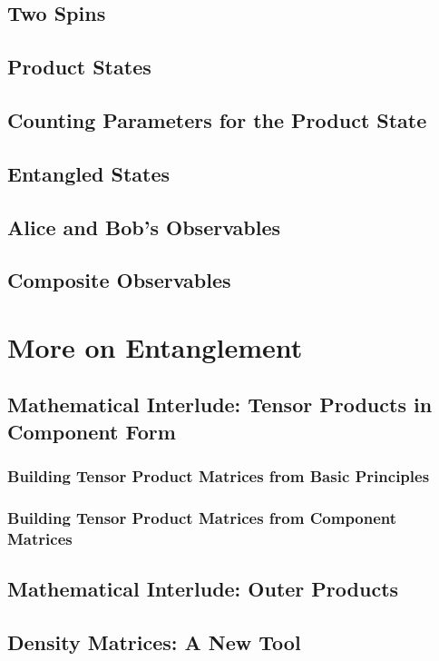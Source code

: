 \documentclass[a4paper]{article}
\begin{document}
\subsection{Two Spins}
\subsection{Product States}

\subsection{Counting Parameters for the Product State}
\subsection{Entangled States}

\subsection{Alice and Bob's Observables}


\subsection{Composite Observables}





\section{More on Entanglement}
\subsection{Mathematical Interlude: Tensor Products in Component Form}
\subsubsection{Building Tensor Product Matrices from Basic Principles}
\subsubsection{Building Tensor Product Matrices from Component Matrices}



\subsection{Mathematical Interlude: Outer Products}
\subsection{Density Matrices: A New Tool}
\end{document}
